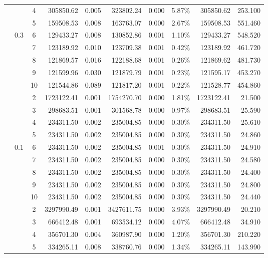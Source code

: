 {\begin{longtable}{cccrcrrcrr}
		&       & 4     & 305850.62 & 0.005 & 323802.24 & 0.000 & 5.87\% & 305850.62 & 253.100 \\
		&       & 5     & 159508.53 & 0.008 & 163763.07 & 0.000 & 2.67\% & 159508.53 & 551.460 \\
		& 0.3   & 6     & 129433.27 & 0.008 & 130852.86 & 0.001 & 1.10\% & 129433.27 & 548.520 \\
		&       & 7     & 123189.92 & 0.010 & 123709.38 & 0.001 & 0.42\% & 123189.92 & 461.720 \\
		&       & 8     & 121869.57 & 0.016 & 122188.68 & 0.001 & 0.26\% & 121869.62 & 481.730 \\
		&       & 9     & 121599.96 & 0.030 & 121879.79 & 0.001 & 0.23\% & 121595.17 & 453.270 \\
		&       & 10    & 121544.86 & 0.089 & 121817.20 & 0.001 & 0.22\% & 121528.77 & 454.860 \\
		\cmidrule(r){3-10}
		&       & 2     & 1723122.41 & 0.001 & 1754270.70 & 0.000 & 1.81\% & 1723122.41 & 21.500 \\
		&       & 3     & 298683.51 & 0.001 & 301568.78 & 0.000 & 0.97\% & 298683.51 & 25.590 \\
		&       & 4     & 234311.50 & 0.002 & 235004.85 & 0.000 & 0.30\% & 234311.50 & 25.610 \\
		&       & 5     & 234311.50 & 0.002 & 235004.85 & 0.000 & 0.30\% & 234311.50 & 24.860 \\
		& 0.1   & 6     & 234311.50 & 0.002 & 235004.85 & 0.001 & 0.30\% & 234311.50 & 24.910 \\
		&       & 7     & 234311.50 & 0.002 & 235004.85 & 0.000 & 0.30\% & 234311.50 & 24.580 \\
		&       & 8     & 234311.50 & 0.002 & 235004.85 & 0.000 & 0.30\% & 234311.50 & 24.400 \\
		&       & 9     & 234311.50 & 0.002 & 235004.85 & 0.000 & 0.30\% & 234311.50 & 24.800 \\
		&       & 10    & 234311.50 & 0.002 & 235004.85 & 0.000 & 0.30\% & 234311.50 & 24.440 \\
		&       & 2     & 3297990.49 & 0.001 & 3427611.75 & 0.000 & 3.93\% & 3297990.49 & 20.210 \\
		&       & 3     & 666412.48 & 0.001 & 693534.12 & 0.000 & 4.07\% & 666412.48 & 34.910 \\
		&       & 4     & 356701.30 & 0.004 & 360987.90 & 0.000 & 1.20\% & 356701.30 & 210.220 \\
		&       & 5     & 334265.11 & 0.008 & 338760.76 & 0.000 & 1.34\% & 334265.11 & 143.990 \\

\end{longtable}}
